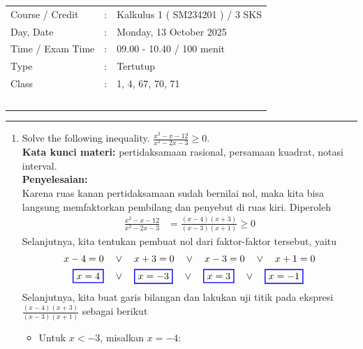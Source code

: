 \documentclass[10pt,openany,a4paper]{article}
\theoremstyle{definition}
\theoremstyle{definition}
\theoremstyle{plain}
\newenvironment{jawab}[2][tes]{
\textbf{Kata kunci materi:} #1.\\
\textbf{Penyelesaian:} #2
}{}
\begin{document}
    \begin{center}
	\begin{tabular}{lcl}
		Course / Credit & : & Kalkulus 1 ( SM234201 ) / 3 SKS\\
		Day, Date & : & Monday, 13 October 2025\\
		Time / Exam Time & : & 09.00 - 10.40 / 100 menit\\
		Type & : & Tertutup\\
		Class & : & 1, 4, 67, 70, 71\\
  ~
	\end{tabular}
    
    \noindent\rule{\textwidth}{2.pt}
        \end{center}
\begin{enumerate}
           \item Solve the following inequality.
    \( \frac{x^2 - x - 12}{x^2 - 2x - 3} \ge 0. \)\\
    \begin{jawab}[pertidaksamaan rasional, persamaan kuadrat, notasi interval]{~\\
    Karena ruas kanan pertidaksamaan sudah bernilai nol, maka kita bisa langsung memfaktorkan pembilang dan penyebut di ruas kiri. Diperoleh
    \begin{align*}
        \frac{x^2 - x - 12}{x^2 - 2x - 3} &= \frac{(x-4)(x+3)}{(x-3)(x+1)} \ge 0
    \end{align*}
    Selanjutnya, kita tentukan pembuat nol dari faktor-faktor tersebut, yaitu
    \begin{align*}
        x-4 = 0 \quad &\vee\quad x+3 = 0 \quad \vee\quad x-3 = 0 \quad \vee\quad x+1 = 0\\
        \colorlet{oldcolor}{.}
        \color{blue}
        \setlength{\fboxrule}{1pt} \boxed{\color{oldcolor}x=4}\color{oldcolor} \quad &\vee\quad \colorlet{oldcolor}{.}
        \color{blue}
        \setlength{\fboxrule}{1pt} \boxed{\color{oldcolor}x=-3}\color{oldcolor} \quad \vee\quad \colorlet{oldcolor}{.}
        \color{blue}
        \setlength{\fboxrule}{1pt} \boxed{\color{oldcolor}x=3}\color{oldcolor} \quad \vee\quad \colorlet{oldcolor}{.}
        \color{blue}
        \setlength{\fboxrule}{1pt} \boxed{\color{oldcolor}x=-1}\color{oldcolor}
    \end{align*}
    Selanjutnya, kita buat garis bilangan dan lakukan uji titik pada ekspresi \(\frac{(x-4)(x+3)}{(x-3)(x+1)}\) sebagai berikut
    \begin{itemize}
        \item Untuk \(x < -3\), misalkan \(x = -4\):

\end{itemize}}
\end{jawab}
\end{enumerate}
\end{document}
